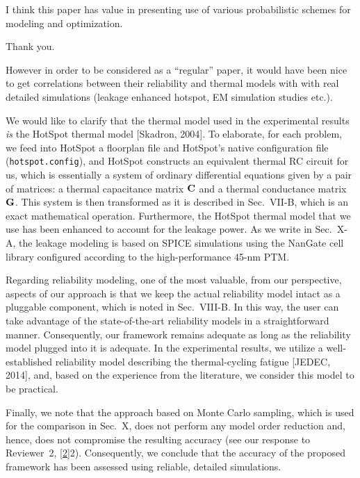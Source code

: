 \begin{reviewer}
I think this paper has value in presenting use of various probabilistic schemes
for modeling and optimization.
\end{reviewer}

\begin{authors}
  Thank you.
\end{authors}

\begin{reviewer}
However in order to be considered as a ``regular'' paper, it would have been
nice to get correlations between their reliability and thermal models with with
real detailed simulations (leakage enhanced hotspot, EM simulation studies
etc.).
\end{reviewer}

\begin{authors}
We would like to clarify that the thermal model used in the experimental results
\emph{is} the HotSpot thermal model [Skadron, 2004]. To elaborate, for each
problem, we feed into HotSpot a floorplan file and HotSpot's native
configuration file (\texttt{hotspot.config}), and HotSpot constructs an
equivalent thermal RC circuit for us, which is essentially a system of ordinary
differential equations given by a pair of matrices: a thermal capacitance matrix
$\mathbf{C}$ and a thermal conductance matrix $\mathbf{G}$. This system is then
transformed as it is described in Sec.~VII-B, which is an exact mathematical
operation. Furthermore, the HotSpot thermal model that we use has been enhanced
to account for the leakage power. As we write in Sec.~X-A, the leakage modeling
is based on SPICE simulations using the NanGate cell library configured
according to the high-performance 45-nm PTM.

Regarding reliability modeling, one of the most valuable, from our perspective,
aspects of our approach is that we keep the actual reliability model intact as a
pluggable component, which is noted in Sec.~VIII-B. In this way, the user can
take advantage of the state-of-the-art reliability models in a straightforward
manner. Consequently, our framework remains adequate as long as the reliability
model plugged into it is adequate. In the experimental results, we utilize a
well-established reliability model describing the thermal-cycling fatigue
[JEDEC, 2014], and, based on the experience from the literature, we consider
this model to be practical.

Finally, we note that the approach based on Monte Carlo sampling, which is used
for the comparison in Sec.~X, does not perform any model order reduction and,
hence, does not compromise the resulting accuracy (see our response to
Reviewer~2, \cref{2}{2}). Consequently, we conclude that the accuracy of the
proposed framework has been assessed using reliable, detailed simulations.

\begin{actions}
\end{actions}
\end{authors}

